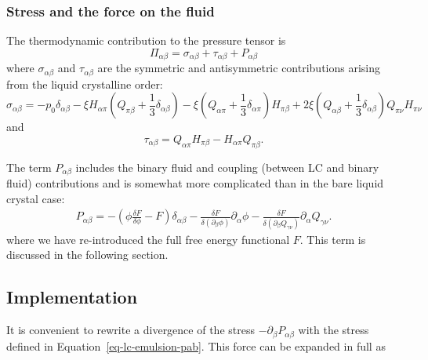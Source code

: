 \subsubsection{Stress and the force on the fluid}
The thermodynamic contribution to the pressure tensor is
\begin{equation}
\label{eq-lc-emulsion-stress}
\Pi_{\alpha\beta} = \sigma_{\alpha\beta} + \tau_{\alpha\beta} + P_{\alpha\beta}
\end{equation}
where $\sigma_{\alpha\beta}$ and $\tau_{\alpha\beta}$ are the symmetric and
antisymmetric contributions
arising from the liquid crystalline order: 
\begin{equation}
\sigma_{\alpha\beta} =
-p_0\delta_{\alpha\beta}
- \xi H_{\alpha\pi}
  \left(Q_{\pi\beta}+{\textstyle \frac{1}{3}} \delta_{\alpha\beta}\right)
- \xi
  \left(Q_{\alpha\pi} + {\textstyle\frac{1}{3}}\delta_{\alpha\pi}\right)
  H_{\pi\beta}
+ 2\xi \left(Q_{\alpha\beta} + {\textstyle \frac{1}{3}}\delta_{\alpha\beta}
\right) Q_{\pi\nu} H_{\pi\nu}
\nonumber
\end{equation}
and
\begin{equation}
\tau_{\alpha\beta} = Q_{\alpha\pi} H_{\pi\beta} - H_{\alpha\pi}Q_{\pi\beta}.
\nonumber
\end{equation}

The term $P_{\alpha\beta}$ includes the binary fluid and coupling
(between LC and binary fluid) contributions and is somewhat more
complicated than in the bare liquid crystal case:
\begin{eqnarray}
\label{eq-lc-emulsion-pab}
P_{\alpha\beta} =
-\left( \phi\frac{\delta  F}{\delta\phi} - F \right) \delta_{\alpha\beta}
-\frac{\delta F}{\delta \left(\partial_{\beta}\phi\right)}\partial_{\alpha}\phi
-\frac{\delta F}{\delta\left(\partial_{\beta}Q_{\gamma\nu}\right)}\partial_{\alpha}Q_{\gamma\nu}.
\end{eqnarray}
where we have re-introduced the full free energy functional $F$.
This term is discussed in the following section.

\subsection{Implementation}

It is convenient \cite{sulaiman2006} to rewrite a divergence of the
stress  $-\partial_\beta P_{\alpha\beta}$ with the stress defined in
Equation~\ref{eq-lc-emulsion-pab}. This force can be expanded in full as

